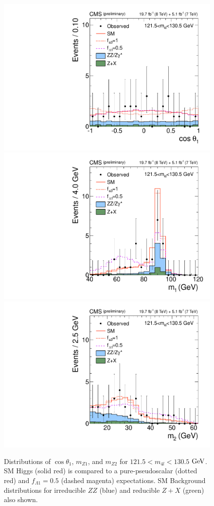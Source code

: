 \begin{figure}[htbp]
\begin{center}
\includegraphics[width=.3\linewidth]{HiggsProperties/figures/cCompare_DataMC_AllTeV_helcosthetaZ1_SignalEnriched.pdf}
\includegraphics[width=.3\linewidth]{HiggsProperties/figures/cCompare_DataMC_AllTeV_Z1Mass_SignalEnriched.pdf}
\includegraphics[width=.3\linewidth]{HiggsProperties/figures/cCompare_DataMC_AllTeV_Z2Mass_SignalEnriched.pdf}
\caption[Kinematic Distributions for SM and Alternative Spin-Parity States near $125.6$ $\rm{GeV}$ Resonance]{Distributions of $\cos\theta_1$, $m_{Z1}$, and $m_{Z2}$ for $121.5<m_{4l}<130.5$ $\rm{GeV}$. SM Higgs (solid red) is compared to a pure-pseudoscalar (dotted red) and $f_{\Lambda 1}=0.5$ (dashed magenta) expectations. SM Background distributions for irreducible $ZZ$ (blue) and reducible $Z+X$ (green) also shown.}
\label{fig:SPKinDistributions}
\end{center}
\end{figure}


